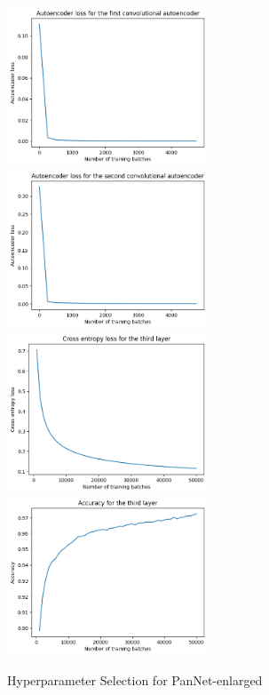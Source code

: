 \begin{figure}[th]
\centering
\includegraphics[width=60mm]{Figures/PanNet-enlarged_search_parameters_1}
\includegraphics[width=60mm]{Figures/PanNet-enlarged_search_parameters_2}
\includegraphics[width=60mm]{Figures/PanNet-enlarged_search_parameters_3_loss}
\includegraphics[width=60mm]{Figures/PanNet-enlarged_search_parameters_3_accuracy}
\decoRule
\caption{Hyperparameter Selection for PanNet-enlarged}
\label{fig:PanNet-enlarge_selection}
\end{figure}

